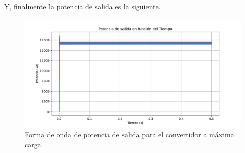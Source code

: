 \begin{appendixd}
	Y, finalmente la potencia de salida es la siguiente.
	
	\begin{figure}
		\centering
		\includegraphics[width=1\linewidth]{img/potencia_completa}
		\caption{Forma de onda de potencia de salida para el convertidor a máxima carga.}
		\label{fig:potenciacompleta}
	\end{figure}
	

\end{appendixd}